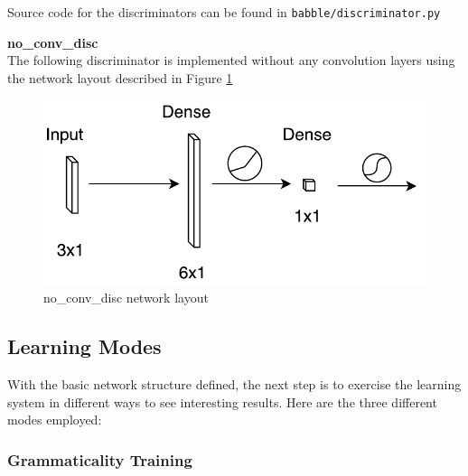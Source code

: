 \documentclass[12pt]{article}
\begin{document}
Source code for the discriminators can be found in \texttt{babble/discriminator.py}

\noindent \textbf{no\_conv\_disc} \\

The following discriminator is implemented without any convolution layers using the network layout described in Figure \ref{fig:no_conv_disc}

\begin{figure}[ht]
    \centering
    \includegraphics{no_conv_disc.pdf}
    \caption{no\_conv\_disc network layout}
    \label{fig:no_conv_disc}
\end{figure}

\subsection{Learning Modes}

With the basic network structure defined, the next step is to exercise the learning system in different ways to see interesting results. Here are the three different modes employed:

\subsubsection{Grammaticality Training}
\end{document}
